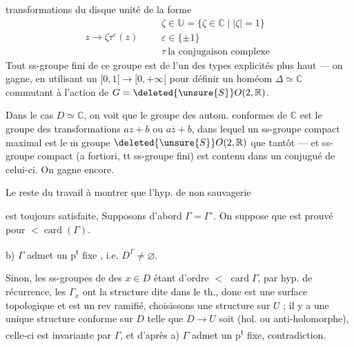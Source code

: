 

transformations du disque unité de la forme
\[
z\longrightarrow\zeta\tau^\varepsilon(z)\qquad
\begin{gathered}
\zeta\in\mathbb U=\{\zeta\in\mathbb C\mid |\zeta|=1\}\\
\varepsilon\in\{\pm1\}\\
\tau\ \text{la conjugaison complexe}
\end{gathered}
\]
Tout ss-groupe fini de ce groupe est de l'un des types explicités plus haut --- on gagne, en utilisant un  $[0,1[\longrightarrow[0,+\infty[$ pour définir un homéom  $\Delta\simeq\mathbb C$ commutant à l'action de $G=\deleted{\unsure{S}}O(2,\mathbb R)$.

Dans le cas $D\simeq\mathbb C$, on voit que  le groupe des autom. conformes de $\mathbb C$ est le groupe des transformations $az+b$ ou $a\overline z+b$, dans lequel un ss-groupe compact maximal est le $\overline{\mathrm m}$ groupe $\deleted{\unsure{S}}O(2,\mathbb R)$ que tantôt --- et  ss-groupe compact (a fortiori, tt ss-groupe fini) est contenu dans un conjugué de celui-ci. On gagne encore.

Le reste du travail  à  montrer que l'hyp. de non sauvagerie



est toujours satisfaite,   Supposons d'abord $\Gamma=\Gamma^\circ$. On suppose que  est prouvé pour   $<\operatorname{card}(\Gamma)$. 

 b) $\Gamma$ admet un p\textsuperscript{t} fixe , i.e. $D^\Gamma\ne\varnothing$.

Sinon, les ss-groupes de   des $x\in D$ étant d'ordre $<$  $\operatorname{card}\Gamma$, par hyp. de récurrence, les $\Gamma_x$ ont la structure dite dans le th., donc  est une surface topologique et  est un rev ramifié, choisissons une structure   sur $U$ ; il y a une unique structure conforme sur $D$ telle que $D\longrightarrow U$ soit   (hol. ou anti-holomorphe), celle-ci est invariante par $\Gamma$, et d'après a) $\Gamma$ admet un p\textsuperscript{t} fixe, contradiction.

